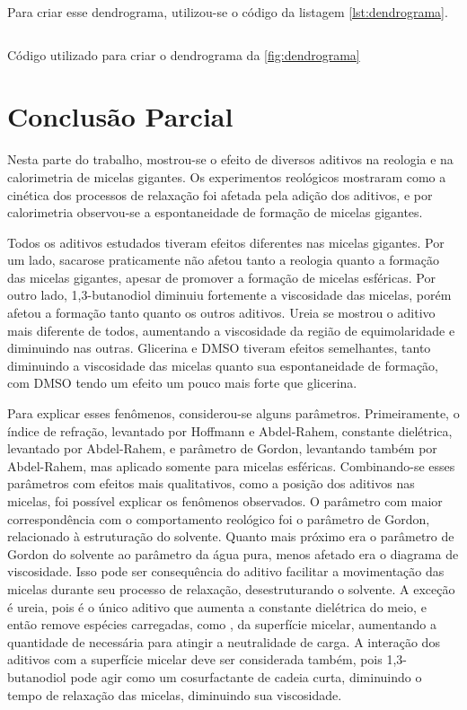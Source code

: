 		Para criar esse dendrograma, utilizou-se o código da listagem \ref{lst:dendrograma}.
		
		\begin{listing}[h]
			\inputminted{python}{./python/dendrograma.py}
			\caption{Código utilizado para criar o dendrograma da \autoref{fig:dendrograma}}
			\label{lst:dendrograma}
		\end{listing}
		\FloatBarrier

		\section{Conclusão Parcial} 
		
		Nesta parte do trabalho, mostrou-se o efeito de diversos aditivos na reologia e na calorimetria de micelas gigantes. Os experimentos reológicos mostraram como a cinética dos processos de relaxação foi afetada pela adição dos aditivos, e por calorimetria observou-se a espontaneidade de formação de micelas gigantes.
		
		Todos os aditivos estudados tiveram efeitos diferentes nas micelas gigantes. Por um lado, sacarose praticamente não afetou tanto a reologia quanto a formação das micelas gigantes, apesar de promover a formação de micelas esféricas. Por outro lado, 1,3-butanodiol diminuiu fortemente a viscosidade das micelas, porém afetou a formação tanto quanto os outros aditivos. Ureia se mostrou o aditivo mais diferente de todos, aumentando a viscosidade da região de equimolaridade e diminuindo nas outras. Glicerina e DMSO tiveram efeitos semelhantes, tanto diminuindo a viscosidade das micelas quanto sua espontaneidade de formação, com DMSO tendo um efeito um pouco mais forte que glicerina.
		
		Para explicar esses fenômenos, considerou-se alguns parâmetros. Primeiramente, o índice de refração, levantado por Hoffmann e Abdel-Rahem, constante dielétrica, levantado por Abdel-Rahem, e parâmetro de Gordon, levantando também por Abdel-Rahem, mas aplicado somente para micelas esféricas. Combinando-se esses parâmetros com efeitos mais qualitativos, como a posição dos aditivos nas micelas, foi possível explicar os fenômenos observados. O parâmetro com maior correspondência com o comportamento reológico foi o parâmetro de Gordon, relacionado à estruturação do solvente. Quanto mais próximo era o parâmetro de Gordon do solvente ao parâmetro da água pura, menos afetado era o diagrama de viscosidade. Isso pode ser consequência do aditivo facilitar a movimentação das micelas durante seu processo de relaxação, desestruturando o solvente. A exceção é ureia, pois é o único aditivo que aumenta a constante dielétrica do meio, e então remove espécies carregadas, como \Sal, da superfície micelar, aumentando a quantidade de \Sal{} necessária para atingir a neutralidade de carga. A interação dos aditivos com a superfície micelar deve ser considerada também, pois 1,3-butanodiol pode agir como um cosurfactante de cadeia curta, diminuindo o tempo de relaxação das micelas, diminuindo sua viscosidade.
		

